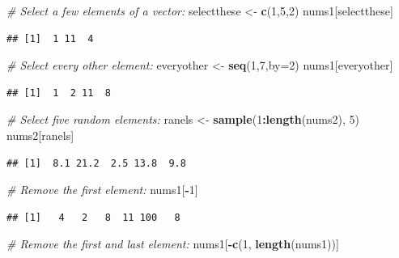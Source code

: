 \documentclass[]{book}
\newenvironment{Shaded}{\begin{snugshade}}{\end{snugshade}}
\newcommand{\CommentTok}[1]{\textcolor[rgb]{0.56,0.35,0.01}{\textit{#1}}}
\newcommand{\DataTypeTok}[1]{\textcolor[rgb]{0.13,0.29,0.53}{#1}}
\newcommand{\DecValTok}[1]{\textcolor[rgb]{0.00,0.00,0.81}{#1}}
\newcommand{\KeywordTok}[1]{\textcolor[rgb]{0.13,0.29,0.53}{\textbf{#1}}}
\newcommand{\NormalTok}[1]{#1}
\newcommand{\OperatorTok}[1]{\textcolor[rgb]{0.81,0.36,0.00}{\textbf{#1}}}
\newcommand{\StringTok}[1]{\textcolor[rgb]{0.31,0.60,0.02}{#1}}
\begin{document}
\begin{Shaded}
\begin{Highlighting}[]
\CommentTok{# Select a few elements of a vector:}
\NormalTok{selectthese <-}\StringTok{ }\KeywordTok{c}\NormalTok{(}\DecValTok{1}\NormalTok{,}\DecValTok{5}\NormalTok{,}\DecValTok{2}\NormalTok{)}
\NormalTok{nums1[selectthese]}
\end{Highlighting}
\end{Shaded}

\begin{verbatim}
## [1]  1 11  4
\end{verbatim}

\begin{Shaded}
\begin{Highlighting}[]
\CommentTok{# Select every other element:}
\NormalTok{everyother <-}\StringTok{ }\KeywordTok{seq}\NormalTok{(}\DecValTok{1}\NormalTok{,}\DecValTok{7}\NormalTok{,}\DataTypeTok{by=}\DecValTok{2}\NormalTok{)}
\NormalTok{nums1[everyother]}
\end{Highlighting}
\end{Shaded}

\begin{verbatim}
## [1]  1  2 11  8
\end{verbatim}

\begin{Shaded}
\begin{Highlighting}[]
\CommentTok{# Select five random elements:}
\NormalTok{ranels <-}\StringTok{ }\KeywordTok{sample}\NormalTok{(}\DecValTok{1}\OperatorTok{:}\KeywordTok{length}\NormalTok{(nums2), }\DecValTok{5}\NormalTok{)}
\NormalTok{nums2[ranels]}
\end{Highlighting}
\end{Shaded}

\begin{verbatim}
## [1]  8.1 21.2  2.5 13.8  9.8
\end{verbatim}

\begin{Shaded}
\begin{Highlighting}[]
\CommentTok{# Remove the first element:}
\NormalTok{nums1[}\OperatorTok{-}\DecValTok{1}\NormalTok{]}
\end{Highlighting}
\end{Shaded}

\begin{verbatim}
## [1]   4   2   8  11 100   8
\end{verbatim}

\begin{Shaded}
\begin{Highlighting}[]
\CommentTok{# Remove the first and last element:}
\NormalTok{nums1[}\OperatorTok{-}\KeywordTok{c}\NormalTok{(}\DecValTok{1}\NormalTok{, }\KeywordTok{length}\NormalTok{(nums1))]}
\end{Highlighting}
\end{Shaded}
\end{document}
